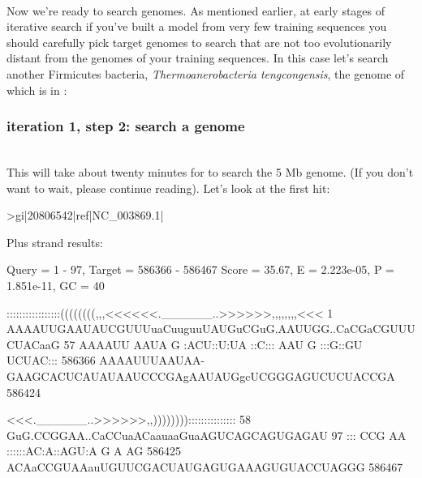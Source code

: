 \\

Now we're ready to search genomes. As mentioned earlier, at early
stages of iterative search if you've built a model from very few
training sequences you should carefully pick target genomes to search that are
not too evolutionarily distant from the genomes of your training
sequences. In this case let's search another Firmicutes bacteria,
\emph{Thermoanerobacteria tengcongensis}, the genome of which is in \newline
{}:

\subsubsection{iteration 1, step 2: search a genome}

\\

This will take about twenty minutes for  to search the 5 Mb
genome. (If you don't want to wait, please continue reading).
Let's look at the first hit:

{\samepage
\begin{sreoutput}
>gi|20806542|ref|NC_003869.1|

  Plus strand results:

 Query = 1 - 97, Target = 586366 - 586467
 Score = 35.67, E = 2.223e-05, P = 1.851e-11, GC =  40

           :::::::::::::::::((((((((,,,<<<<<<.______..>>>>>>,,,,,,,,<<<
         1 AAAAUUGAAUAUCGUUUuaCuuguuUAUGuCGuG.AAUUGG..CaCGaCGUUUCUACaaG 57      
           AAAAUU AAUA  G   :ACU::U:UA ::C::: AAU  G  :::G::GU UCUAC:::
    586366 AAAAUUUAAUAA-GAAGCACUCAUAUAAUCCCGAgAAUAUGgcUCGGGAGUCUCUACCGA 586424  

           <<<.______..>>>>>>,,)))))))):::::::::::::::
        58 GuG.CCGGAA..CaCCuaACaauaaGuaAGUCAGCAGUGAGAU 97      
           ::: CCG AA  ::::::AC:A::AGU:A    G A   AG  
    586425 ACAaCCGUAAauUGUUCGACUAUGAGUGAAAGUGUACCUAGGG 586467  
\end{sreoutput}
}

